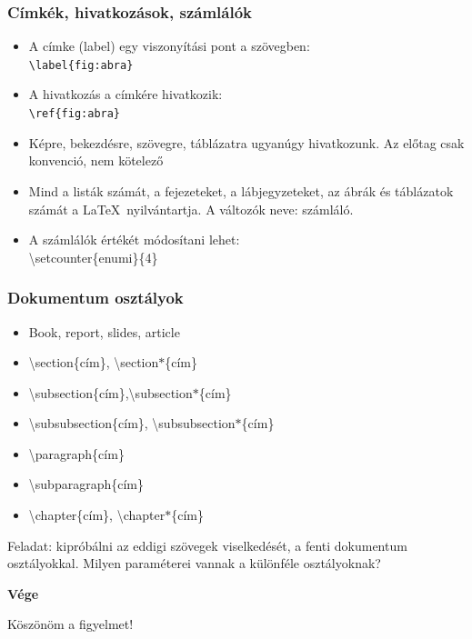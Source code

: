 \documentclass[t,aspectratio=169]{beamer}
\begin{document}

\begin{frame}
\frametitle{Címkék, hivatkozások, számlálók}
\setlength{\parskip}{6pt}
\begin{itemize}
\setlength{\itemsep}{0pt}
\item A címke (label) egy viszonyítási pont a szövegben:\\ \texttt{\textbackslash label\{fig:abra\}}
\item A hivatkozás a címkére hivatkozik:\\ \texttt{\textbackslash ref\{fig:abra\}}
\item Képre, bekezdésre, szövegre, táblázatra ugyanúgy hivatkozunk. Az előtag csak konvenció, nem kötelező
\item Mind a listák számát, a fejezeteket, a lábjegyzeteket, az ábrák és táblázatok számát a \LaTeX\ nyilvántartja. A változók neve: számláló.
\item A számlálók értékét módosítani lehet:\\ \textbackslash setcounter\{enumi\}\{4\}
\end{itemize}
\end{frame}


\begin{frame}
\frametitle{Dokumentum osztályok}
\setlength{\parskip}{6pt}
\begin{itemize}
\setlength{\itemsep}{0pt}
\item Book, report, slides, article
\item \textbackslash section\{cím\}, \textbackslash section$*$\{cím\}
\item \textbackslash subsection\{cím\},\textbackslash subsection$*$\{cím\} 
\item \textbackslash subsubsection\{cím\}, \textbackslash subsubsection$*$\{cím\}
\item \textbackslash paragraph\{cím\}
\item \textbackslash subparagraph\{cím\}
\item \textbackslash chapter\{cím\}, \textbackslash chapter$*$\{cím\}
\end{itemize}

Feladat: kipróbálni az eddigi szövegek viselkedését, a fenti dokumentum osztályokkal. Milyen paraméterei vannak a különféle osztályoknak?
\end{frame}


\begin{frame}

\vfill
\begin{center}
\textbf{\huge Vége}

\bigskip
Köszönöm a figyelmet!
\end{center}
\vfill
\end{frame}
\end{document}
